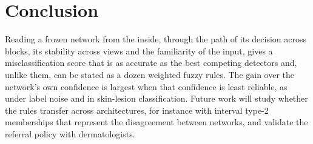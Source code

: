 \documentclass[conference,a4paper]{IEEEtran}
\begin{document}
\section{Conclusion}
Reading a frozen network from the inside, through the path of its decision across blocks, its stability across views and the familiarity
of the input, gives a misclassification score that is as accurate as the best competing detectors and, unlike them, can be stated as a
dozen weighted fuzzy rules. The gain over the network's own confidence is largest when that confidence is least reliable, as under label
noise and in skin-lesion classification. Future work will study whether the rules transfer across architectures, for instance with
interval type-2 memberships that represent the disagreement between networks, and validate the referral policy with dermatologists.




\end{document}
